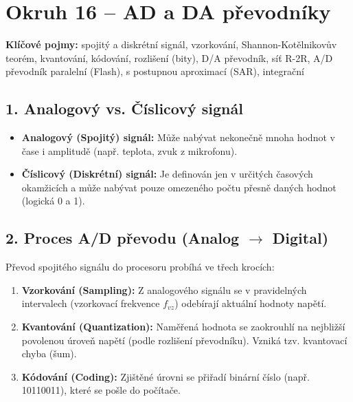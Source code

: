 \documentclass[a4paper,10pt]{article}
\begin{document}
\section*{\large Okruh 16 – AD a DA převodníky}

\begin{pojmybox}
\textbf{Klíčové pojmy:}
spojitý a diskrétní signál, vzorkování, Shannon-Kotělnikovův teorém, kvantování, kódování, rozlišení (bity), D/A převodník, síť R-2R, A/D převodník paralelní (Flash), s postupnou aproximací (SAR), integrační
\end{pojmybox}

\begin{vysvetlenibox}

\subsection*{1. Analogový vs. Číslicový signál}

\begin{itemize}
    \item \textbf{Analogový (Spojitý) signál:} Může nabývat nekonečně mnoha hodnot v čase i amplitudě (např. teplota, zvuk z mikrofonu).
    \item \textbf{Číslicový (Diskrétní) signál:} Je definován jen v určitých časových okamžicích a může nabývat pouze omezeného počtu přesně daných hodnot (logická 0 a 1).
\end{itemize}

\subsection*{2. Proces A/D převodu (Analog $\to$ Digital)}

Převod spojitého signálu do procesoru probíhá ve třech krocích:

\begin{enumerate}
    \item \textbf{Vzorkování (Sampling):} Z analogového signálu se v pravidelných intervalech (vzorkovací frekvence $f_{vz}$) odebírají aktuální hodnoty napětí.
    \item \textbf{Kvantování (Quantization):} Naměřená hodnota se zaokrouhlí na nejbližší povolenou úroveň napětí (podle rozlišení převodníku). Vzniká tzv. kvantovací chyba (šum).
    \item \textbf{Kódování (Coding):} Zjištěné úrovni se přiřadí binární číslo (např. 10110011), které se pošle do počítače.
\end{enumerate}


\end{vysvetlenibox}
\end{document}
